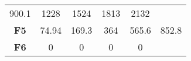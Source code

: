\documentclass[12pt,a4paper]{article}
\begin{document}
\begin{longtable}[c]{@{}cccccc@{}}
\begin{minipage}[t]{0.07\columnwidth}\centering\strut
900.1
\strut\end{minipage} &
\begin{minipage}[t]{0.08\columnwidth}\centering\strut
1228
\strut\end{minipage} &
\begin{minipage}[t]{0.09\columnwidth}\centering\strut
1524
\strut\end{minipage} &
\begin{minipage}[t]{0.10\columnwidth}\centering\strut
1813
\strut\end{minipage} &
\begin{minipage}[t]{0.10\columnwidth}\centering\strut
2132
\strut\end{minipage}\tabularnewline
\begin{minipage}[t]{0.12\columnwidth}\centering\strut
\textbf{F5}
\strut\end{minipage} &
\begin{minipage}[t]{0.07\columnwidth}\centering\strut
74.94
\strut\end{minipage} &
\begin{minipage}[t]{0.08\columnwidth}\centering\strut
169.3
\strut\end{minipage} &
\begin{minipage}[t]{0.09\columnwidth}\centering\strut
364
\strut\end{minipage} &
\begin{minipage}[t]{0.10\columnwidth}\centering\strut
565.6
\strut\end{minipage} &
\begin{minipage}[t]{0.10\columnwidth}\centering\strut
852.8
\strut\end{minipage}\tabularnewline
\begin{minipage}[t]{0.12\columnwidth}\centering\strut
\textbf{F6}
\strut\end{minipage} &
\begin{minipage}[t]{0.07\columnwidth}\centering\strut
0
\strut\end{minipage} &
\begin{minipage}[t]{0.08\columnwidth}\centering\strut
0
\strut\end{minipage} &
\begin{minipage}[t]{0.09\columnwidth}\centering\strut
0
\strut\end{minipage} &
\begin{minipage}[t]{0.10\columnwidth}\centering\strut
0
\strut\end{minipage} &

\end{longtable}
\end{document}
